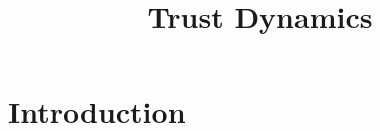 \documentclass{article}
\title{Trust Dynamics}
\begin{document}
\maketitle    

\section{Introduction}
\end{document}
